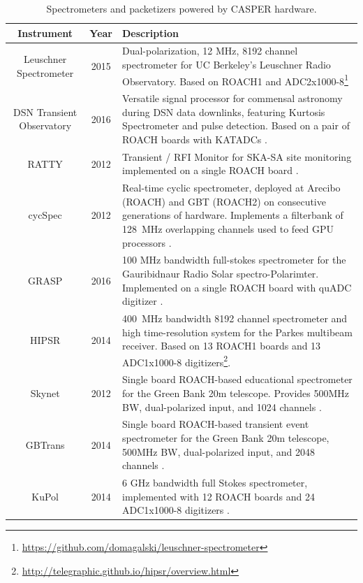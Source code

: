 \documentclass{ws-jai}
\begin{document}
\begin{table}
\label{table:casper-instruments-spectrometers}
\caption{Spectrometers and packetizers powered by CASPER hardware.}
\centering
\begin{tabular}{ccp{10cm}}
  Instrument & Year & Description \\
  \hline
  Leuschner Spectrometer & 2015 & Dual-polarization, 12 MHz, 8192 channel spectrometer for UC Berkeley's Leuschner Radio Observatory. Based on ROACH1 and ADC2x1000-8\footnote{\url{https://github.com/domagalski/leuschner-spectrometer}} \\
  DSN Transient Observatory & 2016 & Versatile signal processor for commensal astronomy during DSN data downlinks, featuring Kurtosis Spectrometer and pulse detection. Based on a pair of ROACH boards with KATADCs \citep{Kuiper et al (in prep)}. \\
  RATTY            & 2012 & Transient / RFI Monitor for SKA-SA site monitoring implemented on a single ROACH board \citep{Foley01082016, Manley thesis}. \\
  cycSpec          & 2012 & Real-time cyclic spectrometer, deployed at Arecibo (ROACH) and GBT (ROACH2) on consecutive generations of hardware. Implements a filterbank of 128~MHz overlapping channels used to feed GPU processors \citep{Jones et al (in prep)}. \\
  GRASP            & 2016 & 100 MHz bandwidth full-stokes spectrometer for the Gauribidnaur Radio Solar spectro-Polarimter. Implemented on a single ROACH board with quADC digitizer \citep{Indrajit}. \\
  HIPSR            & 2014 & 400~MHz bandwidth 8192 channel spectrometer and high time-resolution system for the Parkes multibeam receiver. Based on 13 ROACH1 boards and 13 ADC1x1000-8 digitizers\footnote{\url{http://telegraphic.github.io/hipsr/overview.html}}. \\
  Skynet           & 2012 & Single board ROACH-based educational spectrometer for the Green Bank 20m telescope. Provides 500MHz BW, dual-polarized input, and 1024 channels \citep{skynet}. \\
  GBTrans          & 2014 & Single board ROACH-based transient event spectrometer for the Green Bank 20m telescope, 500MHz BW, dual-polarized input, and 2048 channels \citep{gbtrans}. \\
  KuPol            & 2014 & 6 GHz bandwidth full Stokes spectrometer, implemented with 12 ROACH boards and 24 ADC1x1000-8 digitizers \citep{2013arXiv1303.2131M}. \\

\end{tabular}
\end{table}
\end{document}
